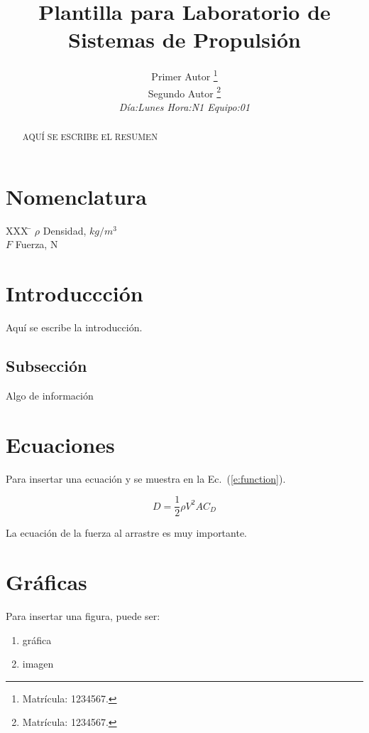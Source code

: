 \documentclass[]{aiaa-LSP}%
\title{Plantilla para Laboratorio de Sistemas de Propulsión}
\author{
  Primer Autor%
    \thanks{Matrícula: 1234567.}
  \\ Segundo Autor%
   \thanks{Matrícula: 1234567.}\\
  {\normalsize\itshape
  Día:Lunes Hora:N1  Equipo:01}
 }
\begin{document}
\maketitle

\begin{abstract}
AQUÍ SE ESCRIBE EL RESUMEN
\end{abstract}

\section*{Nomenclatura}

\begin{tabbing}
  XXX \= \kill%
  $\rho$ \> Densidad, $kg/m^3$ \\
  $F$ \> Fuerza, N \\
 \end{tabbing}

\section{Introduccción}

Aquí se escribe la introducción.

\subsection{Subsección}

Algo de información 

\section{Ecuaciones}

Para insertar una ecuación y se muestra en la Ec.~(\ref{e:function}).

\begin{equation}
 \label{e:function}
D= \frac{1}{2}\rho V^2 A C_D
\end{equation}

La ecuación de la fuerza al arrastre es muy importante.\cite{Ali16}

\section{Gráficas}

Para insertar una figura, puede ser:
\begin{enumerate}
\item gráfica
\item imagen 
\end{enumerate}
\end{document}
